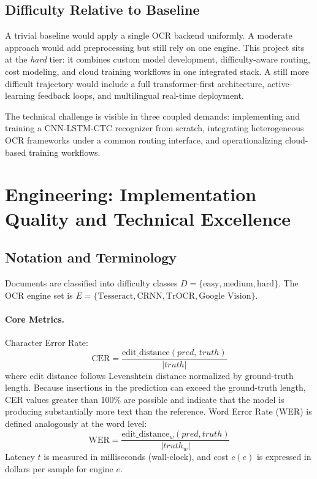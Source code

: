 \documentclass[12pt,a4paper]{article}
\begin{document}
\subsection{Difficulty Relative to Baseline}

A trivial baseline would apply a single OCR backend uniformly. A
moderate approach would add preprocessing but still rely on one
engine. This project sits at the \emph{hard} tier: it combines custom
model development, difficulty-aware routing, cost modeling, and cloud
training workflows in one integrated stack. A still more difficult
trajectory would include a full transformer-first architecture,
active-learning feedback loops, and multilingual real-time deployment.

The technical challenge is visible in three coupled demands:
implementing and training a CNN-LSTM-CTC recognizer from scratch,
integrating heterogeneous OCR frameworks under a common routing
interface, and operationalizing cloud-based training workflows.

\newpage

\section{Engineering: Implementation Quality and Technical
  Excellence}

\subsection{Notation and Terminology}

Documents are classified into difficulty classes
$D = \{\text{easy}, \text{medium}, \text{hard}\}$. The OCR engine
set is
$E = \{\text{Tesseract}, \text{CRNN}, \text{TrOCR},
\text{Google Vision}\}$.

\paragraph{Core Metrics.}
Character Error Rate:
\[
  \text{CER} =
  \frac{\text{edit\_distance}(\mathit{pred},\,
    \mathit{truth})}{|\mathit{truth}|}
\]
where edit distance follows Levenshtein distance normalized by
ground-truth length. Because insertions in the prediction can exceed
the ground-truth length, CER values greater than 100\% are possible
and indicate that the model is producing substantially more text than
the reference. Word Error Rate (WER) is defined analogously at the
word level:
\[
  \text{WER} =
  \frac{\text{edit\_distance}_{w}(\mathit{pred},\mathit{truth})}{|\mathit{truth}_{w}|}
\]
Latency $t$ is measured in milliseconds (wall-clock),
and cost $c(e)$ is expressed in dollars per sample for engine $e$.
\end{document}
